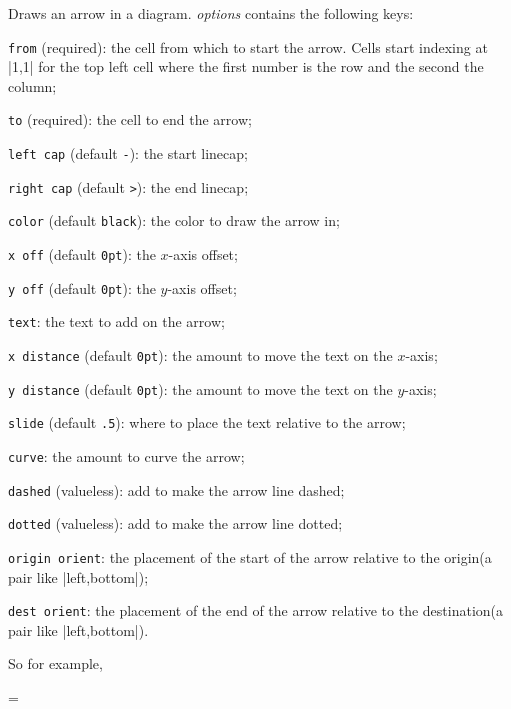 Draws an arrow in a \macro\drawdiagram{} diagram.
{\it options} contains the following keys:
\blist
    \item {\tt from} (required): the cell from which to start the arrow.
        Cells start indexing at \inlinecode|{1,1}| for the top left cell where the first number is the row and the second the column;
    \item {\tt to} (required): the cell to end the arrow;
    \item {\tt left cap} (default {\tt-}): the start linecap;
    \item {\tt right cap} (default {\tt>}): the end linecap;
    \item {\tt color} (default {\tt black}): the color to draw the arrow in;
    \item {\tt x off} (default {\tt0pt}): the $x$-axis offset;
    \item {\tt y off} (default {\tt0pt}): the $y$-axis offset;
    \item {\tt text}: the text to add on the arrow;
    \item {\tt x distance} (default {\tt0pt}): the amount to move the text on the $x$-axis;
    \item {\tt y distance} (default {\tt0pt}): the amount to move the text on the $y$-axis;
    \item {\tt slide} (default {\tt.5}): where to place the text relative to the arrow;
    \item {\tt curve}: the amount to curve the arrow;
    \item {\tt dashed} (valueless): add to make the arrow line dashed;
    \item {\tt dotted} (valueless): add to make the arrow line dotted;
    \item {\tt origin orient}: the placement of the start of the arrow relative to the origin\hfill\break (a pair like \inlinecode|{left,bottom}|);
    \item {\tt dest orient}: the placement of the end of the arrow relative to the destination\hfill\break (a pair like \inlinecode|{left,bottom}|).
\elist
\emacroexp

So for example, 

\bgroup\parindent=\z@
\beginhi \color{white}
\endhi
\egroup

